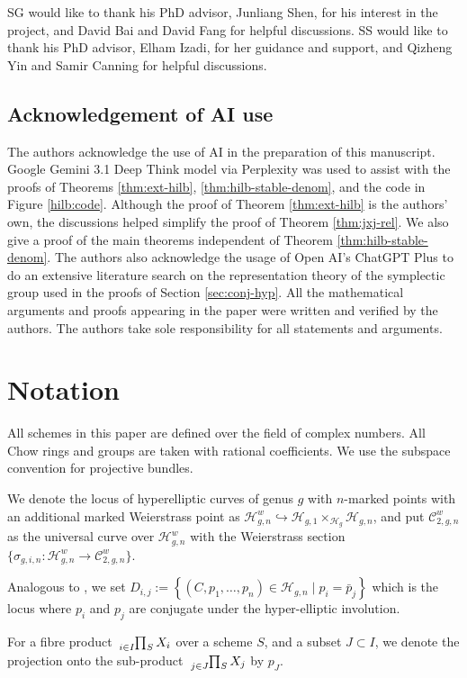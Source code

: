 \documentclass[11pt]{amsart}
\theoremstyle{definition}
\newcommand{\ri}{\rightarrow}
\newcommand{\s}{\sigma}
\newcommand{\h}{\mathcal{H}}
\newcommand{\mC}{\mathcal{C}}
\newcommand{\hr}{\hookrightarrow}
\begin{document}
SG would like to thank his PhD advisor, Junliang Shen, for his interest in the project, and David Bai and David Fang for helpful discussions. SS would like to thank his PhD advisor, Elham Izadi, for her guidance and support, and Qizheng Yin and Samir Canning for helpful discussions.

\subsection*{Acknowledgement of AI use}
The authors acknowledge the use of AI in the preparation of this manuscript. Google Gemini 3.1 Deep Think model via Perplexity was used to assist with the proofs of Theorems \ref{thm:ext-hilb}, \ref{thm:hilb-stable-denom}, and the code in Figure \ref{hilb:code}. Although the proof of Theorem \ref{thm:ext-hilb} is the authors' own, the discussions helped simplify the proof of Theorem \ref{thm:jxj-rel}. We also give a proof of the main theorems independent of Theorem \ref{thm:hilb-stable-denom}. The authors also acknowledge the usage of Open AI's ChatGPT Plus to do an extensive literature search on the representation theory of the symplectic group used in the proofs of Section \ref{sec:conj-hyp}. All the mathematical arguments and proofs appearing in the paper were written and verified by the authors. The authors take sole responsibility for all statements and arguments.

\section*{Notation}\label{notation}
	\noindent All schemes in this paper are defined over the field of complex numbers. 
	All Chow rings and groups are taken with rational coefficients. We use the subspace convention for projective bundles. 
	
	We denote the locus of hyperelliptic curves of genus $g$ with $n$-marked points with an additional marked Weierstrass point as $\mathcal{H}^w_{g,n}\hr \h_{g,1}\times_{\h_g}\h_{g,n}$, and put $\mC^w_{2,g,n}$ as the universal curve over $\mathcal{H}^w_{g,n}$ with the Weierstrass section $\{\s_{g,i,n}: \mathcal{H}^w_{g,n}\ri \mC^w_{2,g,n}\}$.  

    Analogous to \cite{cl-hyp}, we set $D_{i,j}:= \left \{ (C,p_1,\dots, p_n)\in \mathcal H_{g,n}\mid p_i = \bar p_j \right \}$ which is the locus where $p_i$ and $p_j$ are conjugate under the hyper-elliptic involution. 
	
	For a fibre product $\tensor[_{i\in I}]{\prod}{_S}X_i$ over a scheme $S$, and a subset $J\subset I$, we denote the projection onto the sub-product $\tensor[_{j\in J}]{\prod}{_S}X_j$ by $p_J$. 
\end{document}
